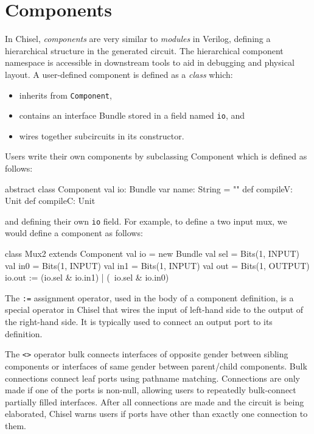 \documentclass[10pt,twocolumn]{article}
\def\code#1{{\small\tt #1}}
\begin{document}
\section{Components}

In Chisel, {\em components} are very similar to {\em modules} in
Verilog, defining a hierarchical structure in the generated circuit.
The hierarchical component namespace is accessible in downstream tools
to aid in debugging and physical layout.  A user-defined component is
defined as a {\em class} which:
\begin{itemize}
\item inherits from \code{Component},
\item contains an interface Bundle stored in a field named \code{io}, and
\item wires together subcircuits in its constructor.
\end{itemize}

Users write their own components by subclassing Component which is
defined as follows:

\begin{scala}
abstract class Component {
  val io: Bundle
  var name: String = ""
  def compileV: Unit
  def compileC: Unit
}
\end{scala}

\noindent
and defining their own \code{io} field.  For example, to define a two
input mux, we would define a component as follows:

\begin{scala}
class Mux2 extends Component {
  val io = new Bundle{
    val sel = Bits(1, INPUT)
    val in0 = Bits(1, INPUT)
    val in1 = Bits(1, INPUT)
    val out = Bits(1, OUTPUT)
  }
  io.out := (io.sel & io.in1) | (~io.sel & io.in0)
}
\end{scala}

\noindent
The \code{:=} assignment operator, used in the body of a
component definition, is a special operator in Chisel that wires the input of
left-hand side to the output of the right-hand side.  It is typically
used to connect an output port to its definition.

The \code{<>} operator bulk connects interfaces of opposite gender between
sibling components or interfaces of same gender between parent/child components. 
Bulk connections connect leaf ports using pathname matching.
Connections are only made if one of the ports is non-null,
allowing users to repeatedly bulk-connect partially filled interfaces.
After all connections are made and the circuit is being elaborated,
Chisel warns users if ports have other than exactly one connection to them.
\end{document}
